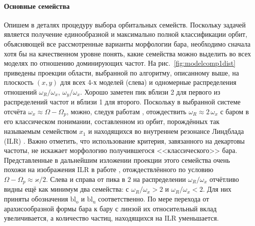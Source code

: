 \documentclass[tikz]{trlnotes}
\begin{document}
\paragraph{Основные семейства}
Опишем в деталях процедуру выбора орбитальных семейств. 
Поскольку задачей является получение единообразной и максимально полной классификации орбит, объясняющей все рассмотренные варианты морфологии бара, необходимо сначала хотя бы на качественном уровне понять, какие семейства можно выделить во всех моделях по отношению доминирующих частот. На рис.~\ref{fig:modelcomp1dist} приведены проекции области,
выбранной по алгоритму, описанному выше, на плоскость $(x,y)$ для всех 4-х моделей (слева) и одномерные распределения отношений $ω_R/ω_x$, $ω_y/ω_x$. Хорошо заметен пик вблизи
2 для первого из распределений частот и вблизи 1 для второго. Поскольку в выбранной системе отсчёта $ω_x \approx Ω - Ω_p$, можно, следуя работам \citet{gajda2016,portail2015}, отождествить $ω_R \approx 2\, ω_x$ с баром в его классическом
понимании, составленном из орбит,
порождённых так называемым семейством $x_1$ и находящихся во внутреннем резонансе Линдблада (ILR) \citep{athanassoula2003}.
Важно отметить, что использование критерия, завязанного на декартовы частоты, не искажает морфологию получившегося <<классического>> бара. Представленные в дальнейшим изложении
проекции этого семейства очень похожи на изображения ILR в работе \citet[Fig.~10]{ceverino2007}, отождествлённого по условию $Ω - Ω_p \approx ϰ/2$. Слева и справа от пика в $2$ на распределении $ω_R/ω_x$ отчётливо видны ещё как минимум два семейства:
с $ω_R/ω_x > 2$ и $ω_R/ω_x < 2$. Для них приняты обозначения $\text{bl}_{\text{o}}$ и $\text{bl}_{\text{u}}$
соответственно.
По мере перехода от арахисообразной формы бара к бару с линзой их
относительный вклад увеличивается, а количество частиц, находящихся на
ILR уменьшается. 
\end{document}
